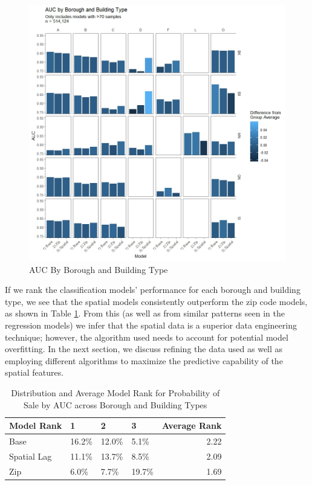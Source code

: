 \documentclass[conference,final,]{IEEEtran}
\makeatletter
\def\maxwidth{\ifdim\Gin@nat@width>\linewidth\linewidth
\else\Gin@nat@width\fi}
\let\Oldincludegraphics\includegraphics
\renewcommand{\includegraphics}[1]{\Oldincludegraphics[width=\maxwidth]{#1}}
\makeatother
\begin{document}
\begin{figure}
\centering
\includegraphics{Sections/tables_and_figures/AUC_by_boro_and_build_type.jpeg}
\caption{\label{fig:AUC by boro and build type}AUC By Borough and
Building Type}
\end{figure}

If we rank the classification models' performance for each borough and
building type, we see that the spatial models consistently outperform
the zip code models, as shown in Table \ref{tab:ProbModelAUCRank}. From
this (as well as from similar patterns seen in the regression models) we
infer that the spatial data is a superior data engineering technique;
however, the algorithm used needs to account for potential model
overfitting. In the next section, we discuss refining the data used as
well as employing different algorithms to maximize the predictive
capability of the spatial features.

\begin{table}

\caption{\label{tab:Prob Model AUC Average Rank}\label{tab:ProbModelAUCRank} Distribution and Average Model Rank for Probability of Sale by AUC across Borough and Building Types}
\centering
\begin{tabular}[t]{l|l|l|l|r}
\hline
Model Rank & 1 & 2 & 3 & Average Rank\\
\hline
Base & 16.2\% & 12.0\% & 5.1\% & 2.22\\
\hline
Spatial Lag & 11.1\% & 13.7\% & 8.5\% & 2.09\\
\hline
Zip & 6.0\% & 7.7\% & 19.7\% & 1.69\\
\hline
\end{tabular}
\end{table}
\end{document}
